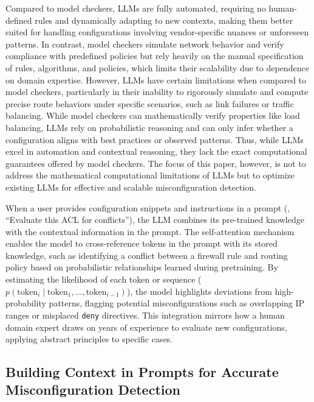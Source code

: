 Compared to model checkers, LLMs are fully automated, requiring no human-defined rules and dynamically adapting to new contexts, making them better suited for handling configurations involving vendor-specific nuances or unforeseen patterns. In contrast, model checkers simulate network behavior and verify compliance with predefined policies but rely heavily on the manual specification of rules, algorithms, and policies, which limits their scalability due to dependence on domain expertise. However, LLMs have certain limitations when compared to model checkers, particularly in their inability to rigorously simulate and compute precise route behaviors under specific scenarios, such as link failures or traffic balancing. While model checkers can mathematically verify properties like load balancing, LLMs rely on probabilistic reasoning and can only infer whether a configuration aligns with best practices or observed patterns. Thus, while LLMs excel in automation and contextual reasoning, they lack the exact computational guarantees offered by model checkers. The focus of this paper, however, is not to address the mathematical computational limitations of LLMs but to optimize existing LLMs for effective and scalable misconfiguration detection.

 When a user provides configuration snippets and instructions in a prompt (\eg, “Evaluate this ACL for conflicts”), the LLM combines its pre-trained knowledge with the contextual information in the prompt. The self-attention mechanism enables the model to cross-reference tokens in the prompt with its stored knowledge, such as identifying a conflict between a firewall rule and routing policy based on probabilistic relationships learned during pretraining. By estimating the likelihood of each token or sequence (\(p(\text{token}_i \mid \text{token}_1, \ldots, \text{token}_{i-1})\)), the model highlights deviations from high-probability patterns, flagging potential misconfigurations such as overlapping IP ranges or misplaced \texttt{deny} directives. This integration mirrors how a human domain expert draws on years of experience to evaluate new configurations, applying abstract principles to specific cases.


\subsection{Building Context in Prompts for Accurate Misconfiguration Detection}

